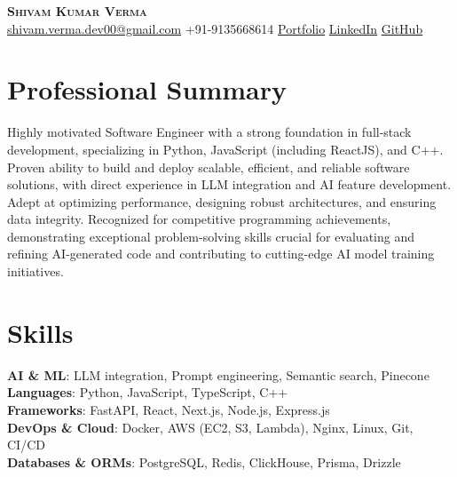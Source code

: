 \documentclass[letterpaper,10pt]{article}
\begin{document}
\begin{center}
  \textbf{\Huge \scshape Shivam Kumar Verma} \\ \vspace{4pt}
  \small \href{mailto:shivam.verma.dev00@gmail.com}{shivam.verma.dev00@gmail.com} \textbullet{} +91-9135668614 \textbullet{} \href{Portfolio}{Portfolio} \textbullet{} \href{LinkedIn}{LinkedIn} \textbullet{} \href{GitHub}{GitHub}
\end{center}

\section{Professional Summary}
\vspace{3pt}
\small{Highly motivated Software Engineer with a strong foundation in full-stack development, specializing in Python, JavaScript (including ReactJS), and C++. Proven ability to build and deploy scalable, efficient, and reliable software solutions, with direct experience in LLM integration and AI feature development. Adept at optimizing performance, designing robust architectures, and ensuring data integrity. Recognized for competitive programming achievements, demonstrating exceptional problem-solving skills crucial for evaluating and refining AI-generated code and contributing to cutting-edge AI model training initiatives.}

\section{Skills}
\begin{itemize}[leftmargin=0.15in, label={}]
  \small{\item{
    \textbf{AI \& ML}{: LLM integration, Prompt engineering, Semantic search, Pinecone} \\ \vspace{2pt}
    \textbf{Languages}{: Python, JavaScript, TypeScript, C++} \\ \vspace{2pt}
    \textbf{Frameworks}{: FastAPI, React, Next.js, Node.js, Express.js} \\ \vspace{2pt}
    \textbf{DevOps \& Cloud}{: Docker, AWS (EC2, S3, Lambda), Nginx, Linux, Git, CI/CD} \\ \vspace{2pt}
    \textbf{Databases \& ORMs}{: PostgreSQL, Redis, ClickHouse, Prisma, Drizzle}
  }}
\end{itemize}
\end{document}

